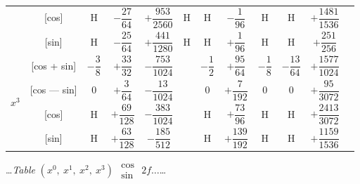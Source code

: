 \documentclass[10pt,a4paper]{article}
\newcommand{\tabletitle}[2]{%
  \begin{center}
  \ldots\textit{Table} #1 $\displaystyle\begin{smallmatrix} \cos \\ \sin \end{smallmatrix}$ #2\ldots
  \end{center}
}
\begin{document}
\begin{center}
\begin{tabular}{|c|c|c|c|c|c|c|c|c|c|c|c|}
& [cos] & H & $-\dfrac{27}{64}$ & $+\dfrac{953}{2560}$ & H & H & $-\dfrac{1}{96}$ & H & H & $+\dfrac{1481}{1536}$ \\
& [sin] & H & $-\dfrac{25}{64}$ & $+\dfrac{441}{1280}$ & H & H & $+\dfrac{1}{96}$ & H & H & $+\dfrac{251}{256}$ \\
\hline
\multirow{4}{*}{$x^3$} & [cos + sin] & $-\dfrac{3}{8}$ & $+\dfrac{33}{32}$ & $-\dfrac{753}{1024}$ & & $-\dfrac{1}{2}$ & $+\dfrac{95}{64}$ & $-\dfrac{1}{8}$ & $-\dfrac{13}{64}$ & $+\dfrac{1577}{1024}$ \\
& [cos --- sin] & $0$ & $+\dfrac{3}{64}$ & $-\dfrac{13}{1024}$ & & $0$ & $+\dfrac{7}{192}$ & $0$ & $0$ & $+\dfrac{95}{3072}$ \\
& [cos] & H & $+\dfrac{69}{128}$ & $-\dfrac{383}{1024}$ & & H & $+\dfrac{73}{96}$ & H & H & $+\dfrac{2413}{3072}$ \\
& [sin] & H & $+\dfrac{63}{128}$ & $-\dfrac{185}{512}$ & & H & $+\dfrac{139}{192}$ & H & H & $+\dfrac{1159}{1536}$ \\
\hline
\end{tabular}
\end{center}

\newpage
\tabletitle{$(x^0,\ x^1,\ x^2,\ x^3)$}{$2f\ldots$}
\end{document}
